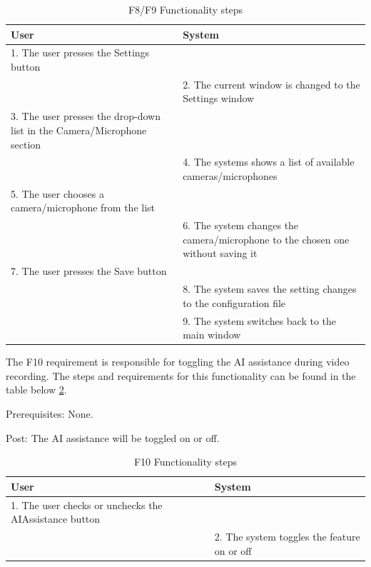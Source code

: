 \begin{table}[htbp]
\begin{center}
\begin{tabular}
{|p{180pt}|p{180pt}|}
\hline
 User & System\\
\hline 
\hline 1. The user presses the Settings button &  \\
\hline  & 2. The current window is changed to the Settings window \\
\hline 3. The user presses the drop-down list in the Camera/Microphone section&  \\
\hline  & 4. The systems shows a list of available cameras/microphones \\
\hline 5. The user chooses a camera/microphone from the list &  \\
\hline  & 6. The system changes the camera/microphone to the chosen one without saving it \\
\hline 7. The user presses the Save button &  \\
\hline  & 8. The system saves the setting changes to the configuration file \\
\hline  & 9. The system switches back to the main window \\
\hline
\end{tabular}
\end{center}
\caption{F8/F9 Functionality steps}
\label{F9Table}
\end{table}

\par The F10 requirement is responsible for toggling the AI assistance during video recording. The steps and requirements for this functionality can be found in the table below \ref{F10Table}.
\par Prerequisites: None.
\par Post: The AI assistance will be toggled on or off.

\begin{table}[htbp]
\begin{center}
\begin{tabular}
{|p{180pt}|p{180pt}|}
\hline
 User & System\\
\hline 
\hline 1. The user checks or unchecks the AIAssistance button &  \\
\hline  & 2. The system toggles the feature on or off \\
\hline
\end{tabular}
\end{center}
\caption{F10 Functionality steps}
\label{F10Table}
\end{table}

